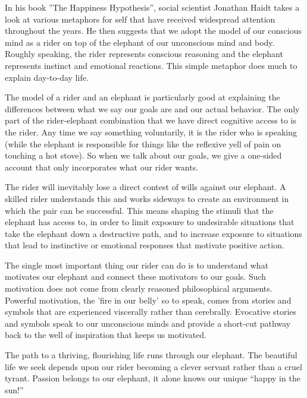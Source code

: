\documentclass[ebook,12pt,openany,twoside]{memoir}
\newcommand{\imagefacingchapter}[1]{
  \cleartoverso
  \clearpage \null
  \thispagestyle{cleared}
  \AddToShipoutPictureBG*{%
    \AtStockLowerLeft{%
      \texttt{[image: \#1]}
    }
  }
  \clearpage
}
\begin{document}
In his book ''The Happiness Hypothesis'', social scientist Jonathan Haidt takes
a look at various metaphors for self that have received widespread attention
throughout the years. He then suggests that we adopt the model of our conscious
mind as a rider on top of the elephant of our unconscious mind and body.
Roughly speaking, the rider represents conscious reasoning and the elephant
represents instinct and emotional reactions. This simple metaphor does much to
explain day-to-day life.

The model of a rider and an elephant is particularly good at explaining the
differences between what we say our goals are and our actual behavior. The only
part of the rider-elephant combination that we have direct cognitive access to
is the rider. Any time we say something voluntarily, it is the rider who is
speaking (while the elephant is responsible for things like the reflexive yell
of pain on touching a hot stove). So when we talk about our goals, we give a
one-sided account that only incorporates what our rider wants.

The rider will inevitably lose a direct contest of wills against our elephant.
A skilled rider understands this and works sideways to create an environment in
which the pair can be successful. This means shaping the stimuli that the
elephant has access to, in order to limit exposure to undesirable situations
that take the elephant down a destructive path, and to increase exposure to
situations that lead to instinctive or emotional responses that motivate
positive action.

The single most important thing our rider can do is to understand what motivates our elephant and connect these motivators to our goals.  Such motivation does not come from clearly reasoned philosophical arguments.  Powerful motivation, the 'fire in our belly' so to speak, comes from stories and symbols that are experienced viscerally rather than cerebrally.  Evocative stories and symbols speak to our
unconscious minds and provide a short-cut pathway back to the well of
inspiration that keeps us motivated.

The path to a thriving, flourishing life runs through our elephant. The
beautiful life we seek depends upon our rider becoming a clever servant rather
than a cruel tyrant. 
Passion belongs to our elephant, it alone knows our unique
``happy in the sun!''






\imagefacingchapter{images/EmpathyIsTranscendant}
\end{document}
